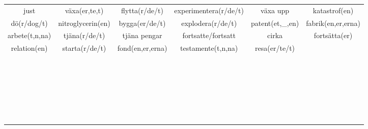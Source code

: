 \begin{center}
\begin{adjustwidth}{-2cm}{}
\begin{tabular}{|c c c c c c|}
            just & växa(er,te,t) & flytta(r/de/t) & experimentera(r/de/t) & växa upp & katastrof(en) \\
            dö(r/dog/t) & nitroglycerin(en) & bygga(er/de/t) & explodera(r/de/t) & patent(et,\_,en) & fabrik(en,er,erna) \\
            arbete(t,n,na) & tjäna(r/de/t) & tjäna pengar & fortsatte/fortsatt & cirka & fortsätta(er) \\
            relation(en) & starta(r/de/t) & fond(en,er,erna) & testamente(t,n,na) & resa(er/te/t) &  \\
             &  &  &  &  &  \\
             &  &  &  &  &  \\
             &  &  &  &  &  \\
             &  &  &  &  &  \\
             &  &  &  &  &  \\
             &  &  &  &  &  \\
             &  &  &  &  &  \\
             &  &  &  &  &  \\
             &  &  &  &  &  \\
             &  &  &  &  &  \\
             &  &  &  &  &  \\
             &  &  &  &  &  \\
             &  &  &  &  &  \\
             &  &  &  &  &  \\
             &  &  &  &  &  \\
             &  &  &  &  &  \\
             &  &  &  &  &  \\
             &  &  &  &  &  \\
             &  &  &  &  &  \\
             &  &  &  &  &  \\
             &  &  &  &  &  \\
             &  &  &  &  &  \\
             &  &  &  &  &  \\
             &  &  &  &  &  \\
             &  &  &  &  &  \\
             &  &  &  &  &  \\
            \hline
        \end{tabular}
    \end{adjustwidth}
\end{center}

